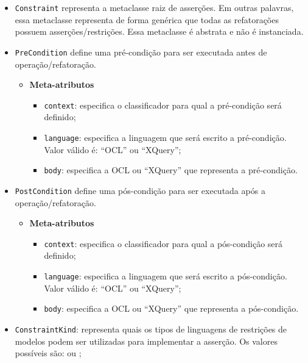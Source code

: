 \begin{itemize}
    
    \item \texttt{Constraint} representa a metaclasse raiz de asserções. Em outras palavras, essa metaclasse representa de forma genérica que todas as refatorações possuem asserções/restrições. Essa metaclasse é abstrata e não é instanciada.
    
    \item \texttt{PreCondition} define uma pré-condição para ser executada antes de operação/refatoração.

\begin{itemize}
	\item \textbf{Meta-atributos}
		\begin{itemize}
			\item \texttt{context}: especifica o classificador para qual a pré-condição será definido;
			\item \texttt{language}: especifica a linguagem que será escrito a pré-condição. Valor válido é: ``OCL'' ou ``XQuery'';
			\item \texttt{body}: especifica a OCL ou ``XQuery'' que representa a pré-condição.
		\end{itemize}	
\end{itemize} 

\item \texttt{PostCondition} define uma pós-condição para ser executada após a operação/refatoração.

\begin{itemize}
	\item \textbf{Meta-atributos}
		\begin{itemize}
			\item \texttt{context}: especifica o classificador para qual a pós-condição será definido;
			\item \texttt{language}: especifica a linguagem que será escrito a pós-condição. Valor válido é: ``OCL'' ou ``XQuery'';
			\item \texttt{body}: especifica a OCL ou ``XQuery'' que representa a pós-condição.
		\end{itemize}	
\end{itemize}

\item \texttt{ConstraintKind}: representa quais os tipos de linguagens de restrições de modelos podem ser utilizadas para implementar a asserção. Os valores possíveis são:  ou ;
    
\end{itemize}

